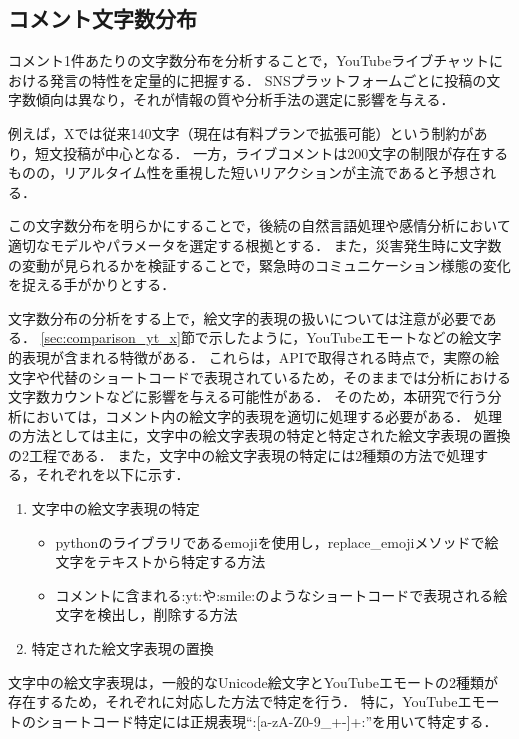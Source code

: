   \subsection{コメント文字数分布}
  \label{sec:comment_length_distribution}
  コメント1件あたりの文字数分布を分析することで，YouTubeライブチャットにおける発言の特性を定量的に把握する．
  SNSプラットフォームごとに投稿の文字数傾向は異なり，それが情報の質や分析手法の選定に影響を与える．

  例えば，Xでは従来140文字（現在は有料プランで拡張可能）という制約があり，短文投稿が中心となる．
  一方，ライブコメントは200文字の制限が存在するものの，リアルタイム性を重視した短いリアクションが主流であると予想される．

  この文字数分布を明らかにすることで，後続の自然言語処理や感情分析において適切なモデルやパラメータを選定する根拠とする．
  また，災害発生時に文字数の変動が見られるかを検証することで，緊急時のコミュニケーション様態の変化を捉える手がかりとする．

  文字数分布の分析をする上で，絵文字的表現の扱いについては注意が必要である．
  \ref{sec:comparison_yt_x}節で示したように，YouTubeエモートなどの絵文字的表現が含まれる特徴がある．
  これらは，APIで取得される時点で，実際の絵文字や代替のショートコードで表現されているため，そのままでは分析における文字数カウントなどに影響を与える可能性がある．
  そのため，本研究で行う分析においては，コメント内の絵文字的表現を適切に処理する必要がある．
  処理の方法としては主に，文字中の絵文字表現の特定と特定された絵文字表現の置換の2工程である．
  また，文字中の絵文字表現の特定には2種類の方法で処理する，それぞれを以下に示す．
  \begin{enumerate}
  \item 文字中の絵文字表現の特定
    \begin{itemize}
    \item pythonのライブラリであるemoji\cite{emoji_pypi}を使用し，replace\_emojiメソッドで絵文字をテキストから特定する方法
    \item コメントに含まれる:yt:や:smile:のようなショートコードで表現される絵文字を検出し，削除する方法
    \end{itemize}
  \item 特定された絵文字表現の置換
  \end{enumerate}
  
  文字中の絵文字表現は，一般的なUnicode絵文字とYouTubeエモートの2種類が存在するため，それぞれに対応した方法で特定を行う．
  特に，YouTubeエモートのショートコード特定には正規表現``:[a-zA-Z0-9\_+-]+:''を用いて特定する．
  
